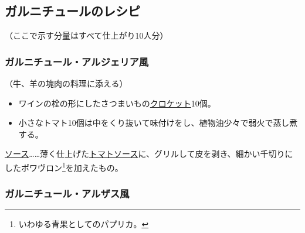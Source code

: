 \hypertarget{garnitures-recettes}{%
\subsection{ガルニチュールのレシピ}\label{garnitures-recettes}}


\begin{center}
\medlarge（ここで示す分量はすべて仕上がり10人分）
\end{center}
\normalsize
\begin{recette}
\hypertarget{garniture-algerienne}{%
\subsubsection{ガルニチュール・アルジェリア風}\label{garniture-algerienne}}



（牛、羊の塊肉の料理に添える）

\begin{itemize}
\item
  ワインの栓の形にしたさつまいもの\protect\hyperlink{croquettes}{クロケット}10個。
\item
  小さなトマト10個は中をくり抜いて味付けをし、植物油少々で弱火で蒸し煮する。
\end{itemize}

\ul{ソース}\ldots{}\ldots{}薄く仕上げた\protect\hyperlink{sauce-tomate}{トマトソース}に、グリルして皮を剥き、細かい千切りにしたポワヴロン\footnote{いわゆる青果としてのパプリカ。}を加えたもの。

\hypertarget{garniture-alsacienne}{%
\subsubsection{ガルニチュール・アルザス風}\label{garniture-alsacienne}}




\end{recette}
